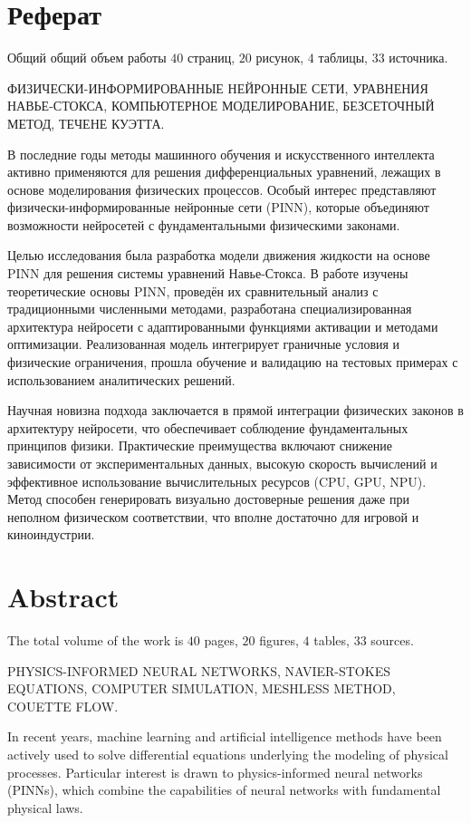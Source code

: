 \chapter*{Реферат}
Общий общий объем работы $40$ страниц, $20$ рисунок, $4$ таблицы, $33$ источника.

ФИЗИЧЕСКИ-ИНФОРМИРОВАННЫЕ НЕЙРОННЫЕ СЕТИ, УРАВНЕНИЯ НАВЬЕ-СТОКСА,
КОМПЬЮТЕРНОЕ МОДЕЛИРОВАНИЕ, БЕЗСЕТОЧНЫЙ МЕТОД, ТЕЧЕНЕ КУЭТТА.

В последние годы методы машинного обучения и искусственного интеллекта активно применяются
для решения дифференциальных уравнений, лежащих в основе моделирования физических процессов.
Особый интерес представляют физически-информированные нейронные сети (PINN), которые
объединяют возможности нейросетей с фундаментальными физическими законами.

Целью исследования
была разработка модели движения жидкости на основе PINN для решения системы уравнений Навье-Стокса.
В работе изучены теоретические основы PINN, проведён их
сравнительный анализ с традиционными численными методами, разработана специализированная
архитектура нейросети с адаптированными функциями активации и методами оптимизации.
Реализованная модель интегрирует граничные условия и физические ограничения, прошла обучение
и валидацию на тестовых примерах с использованием аналитических решений.

Научная новизна подхода заключается в прямой интеграции физических законов в архитектуру
нейросети, что обеспечивает соблюдение фундаментальных принципов физики. Практические
преимущества включают снижение зависимости от экспериментальных данных, высокую скорость
вычислений и эффективное использование вычислительных ресурсов (CPU, GPU, NPU). 
Метод способен генерировать визуально достоверные решения даже при неполном физическом
соответствии, что вполне достаточно для игровой и киноиндустрии.

\chapter*{Abstract}
The total volume of the work is $40$ pages, $20$ figures, $4$ tables, $33$ sources.

PHYSICS-INFORMED NEURAL NETWORKS, NAVIER-STOKES EQUATIONS, 
COMPUTER SIMULATION, MESHLESS METHOD, COUETTE FLOW.

In recent years, machine learning and artificial intelligence methods have been actively used 
to solve differential equations underlying the modeling of physical processes. 
Particular interest is drawn to physics-informed neural networks (PINNs), which 
combine the capabilities of neural networks with fundamental physical laws.

